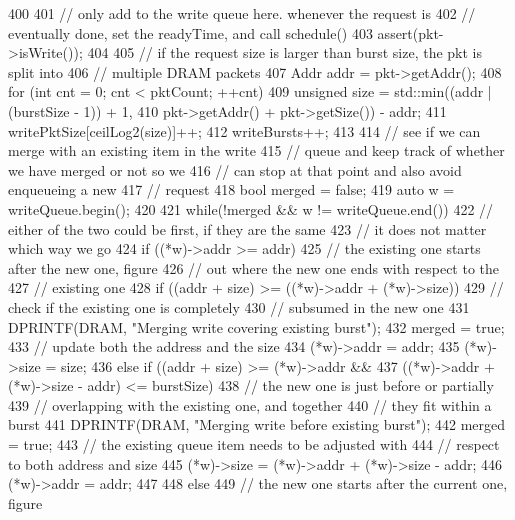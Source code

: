 \begin{DoxyCode}
400 {
401     // only add to the write queue here. whenever the request is
402     // eventually done, set the readyTime, and call schedule()
403     assert(pkt->isWrite());
404 
405     // if the request size is larger than burst size, the pkt is split into
406     // multiple DRAM packets
407     Addr addr = pkt->getAddr();
408     for (int cnt = 0; cnt < pktCount; ++cnt) {
409         unsigned size = std::min((addr | (burstSize - 1)) + 1,
410                         pkt->getAddr() + pkt->getSize()) - addr;
411         writePktSize[ceilLog2(size)]++;
412         writeBursts++;
413 
414         // see if we can merge with an existing item in the write
415         // queue and keep track of whether we have merged or not so we
416         // can stop at that point and also avoid enqueueing a new
417         // request
418         bool merged = false;
419         auto w = writeQueue.begin();
420 
421         while(!merged && w != writeQueue.end()) {
422             // either of the two could be first, if they are the same
423             // it does not matter which way we go
424             if ((*w)->addr >= addr) {
425                 // the existing one starts after the new one, figure
426                 // out where the new one ends with respect to the
427                 // existing one
428                 if ((addr + size) >= ((*w)->addr + (*w)->size)) {
429                     // check if the existing one is completely
430                     // subsumed in the new one
431                     DPRINTF(DRAM, "Merging write covering existing burst\n");
432                     merged = true;
433                     // update both the address and the size
434                     (*w)->addr = addr;
435                     (*w)->size = size;
436                 } else if ((addr + size) >= (*w)->addr &&
437                            ((*w)->addr + (*w)->size - addr) <= burstSize) {
438                     // the new one is just before or partially
439                     // overlapping with the existing one, and together
440                     // they fit within a burst
441                     DPRINTF(DRAM, "Merging write before existing burst\n");
442                     merged = true;
443                     // the existing queue item needs to be adjusted with
444                     // respect to both address and size
445                     (*w)->size = (*w)->addr + (*w)->size - addr;
446                     (*w)->addr = addr;
447                 }
448             } else {
449                 // the new one starts after the current one, figure
}}}}
\end{DoxyCode}
